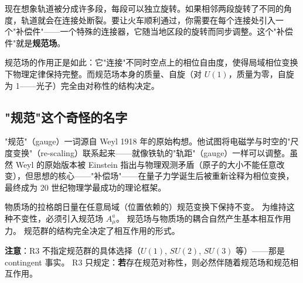 现在想象轨道被分成许多段，每段可以独立旋转。如果相邻两段旋转了不同的角度，轨道就会在连接处断裂。要让火车顺利通过，你需要在每个连接处引入一个"补偿件"——一个特殊的连接器，它随当地区段的旋转而同步调整。这个"补偿件"就是\textbf{规范场}。

规范场的作用正是如此：它"连接"不同时空点上的相位自由度，使得局域相位变换下物理定律保持完整。而规范场本身的质量、自旋（对 $U(1)$，质量为零，自旋为 1——光子）完全由对称性的结构决定。

\subsection{"规范"这个奇怪的名字}

"规范"（gauge）一词源自 Weyl 1918 年的原始构想。他试图将电磁学与时空的"尺度变换"（re-scaling）联系起来——就像铁轨的"轨距"（gauge）一样可以调整。虽然 Weyl 的原始版本被 Einstein 指出与物理观测矛盾（原子的大小不能任意改变），但思想的核心——"补偿场"——在量子力学诞生后被重新诠释为相位变换，最终成为 20 世纪物理学最成功的理论框架。

\begin{principlebox}[R3 — 局域规范不变性]
  物质场的拉格朗日量在任意局域（位置依赖的）规范变换下保持不变。
  为维持这种不变性，必须引入规范场 $A_\mu^a$。
  规范场与物质场的耦合自然产生基本相互作用力。
  规范群的结构完全决定了相互作用的形式。
\end{principlebox}

\textbf{注意}：R3 不指定规范群的具体选择（$U(1)$, $SU(2)$, $SU(3)$ 等）——那是 contingent 事实。
R3 只规定：\textbf{若}存在规范对称性，则必然伴随着规范场和规范相互作用。

